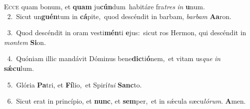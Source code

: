 \lettrine{\initial\textcolor{\initialcolor}{E}}{cce} quam bonum, et \textbf{quam} ju\-\textbf{cún}\-dum~\star habitáre fra\textit{tres} \textit{in} \textbf{u}\-num.\\
{\numbfont\textcolor{\numbcolor}{~2.}}~Sicut un\-\textbf{guén}\-tum in \textbf{cá}\-pite,~\star quod descéndit in barbam, \textit{bar}\-\textit{bam} \textbf{A}\-\textbf{a}ron.\par
{\numbfont\textcolor{\numbcolor}{~3.}}~Quod descéndit in oram vesti\-\textbf{mén}\-ti \textbf{e}\-jus:~\star sicut ros Hermon, qui descéndit in \textit{mon}\-\textit{tem} \textbf{Si}\-on.\par
{\numbfont\textcolor{\numbcolor}{~4.}}~Quóniam illic mandávit Dóminus bene\-\textbf{dic}\-ti\-\textbf{ó}\-nem,~\star et vitam us\textit{que} \textit{in} \textbf{sǽ}\-\textbf{cu}lum.\par
{\numbfont\textcolor{\numbcolor}{~5.}}~Glória \textbf{Pa}\-tri, et \textbf{Fí}\-lio,~\star et Spirí\-\textit{tu}\-\textit{i} \textbf{Sanc}\-to.\par
{\numbfont\textcolor{\numbcolor}{~6.}}~Sicut erat in princípio, et \textbf{nunc}\-, et \textbf{sem}\-per,~\star et in sǽcula sæcu\-\textit{ló}\-\textit{rum}. \textbf{A}\-men.\par
